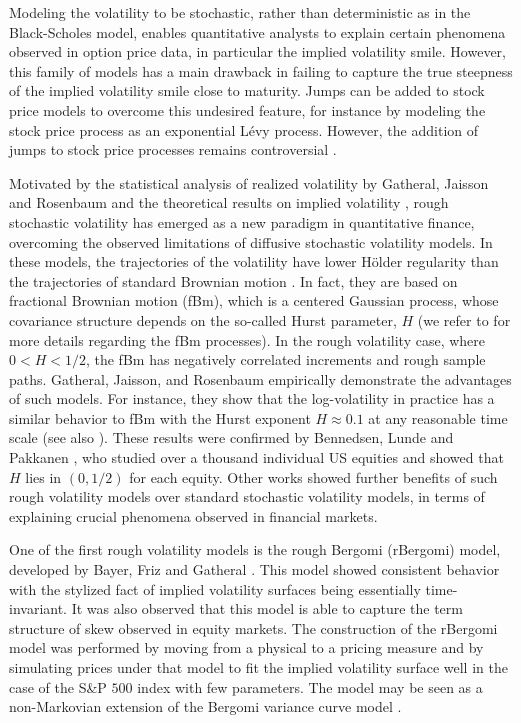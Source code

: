 Modeling the volatility to be stochastic, rather than deterministic as in the Black-Scholes model, enables quantitative analysts to  explain certain phenomena observed in option price data, in particular the implied volatility smile. However, this family of models has a  main drawback in failing  to capture the true steepness of the implied volatility smile close to maturity. Jumps can be added to stock price models to overcome this undesired feature, for instance by modeling the stock price process as an exponential L\'evy process. However, the addition of jumps to stock price processes remains controversial \cite{christensen2014fact,bajgrowicz2015jumps}. 



Motivated by the statistical analysis of realized volatility by Gatheral, Jaisson and Rosenbaum \cite{gatheral2018volatility} and the theoretical results on implied volatility    \cite{alos2007short,fukasawa2011asymptotic}, rough stochastic volatility has emerged as a new paradigm in quantitative finance, overcoming the observed limitations of  diffusive stochastic volatility models. In these models, the trajectories of the volatility  have lower H\"older regularity than the trajectories of standard Brownian motion \cite{bayer2016pricing,gatheral2018volatility}. In fact, they are based on fractional Brownian motion (fBm), which  is a centered Gaussian process, whose covariance structure depends on  the so-called Hurst parameter, $H$ (we refer to  \cite{mandelbrot1968fractional,coutin07introduction,biagini2008stochastic} for more details regarding the fBm processes). In the rough volatility case, where $0<H<1/2$, the fBm has negatively correlated increments and rough sample paths.   Gatheral, Jaisson, and Rosenbaum \cite{gatheral2018volatility}  empirically demonstrate the advantages of such models. For instance, they show that the log-volatility in practice has a similar behavior to  fBm with the Hurst exponent $H \approx 0.1$ at any reasonable time scale (see also  \cite{gatheral2014volatility_2}).  These results were confirmed  by Bennedsen, Lunde and Pakkanen \cite{bennedsen2016decoupling}, who studied over a thousand individual US equities and showed that $H$ lies in $(0,1/2)$ for each equity. Other  works \cite{bennedsen2016decoupling,bayer2016pricing,gatheral2018volatility} showed further benefits of  such rough volatility models over  standard stochastic volatility models,   in terms of explaining crucial phenomena  observed in  financial markets.
 
One of the first rough volatility models is the rough Bergomi (rBergomi) model, developed by Bayer, Friz and Gatheral \cite{bayer2016pricing}. This model showed   consistent behavior with the stylized fact of implied volatility surfaces being essentially time-invariant. It was also observed that this model is able to capture the term structure of skew observed in equity markets. The construction of the rBergomi model was performed by  moving from a physical to a pricing measure and by simulating prices under that model to fit  the implied volatility surface well in the case of the S\&P $500$ index with few parameters. The model may be seen as a non-Markovian extension of the Bergomi variance curve model \cite{bergomi2005smile}.
 
